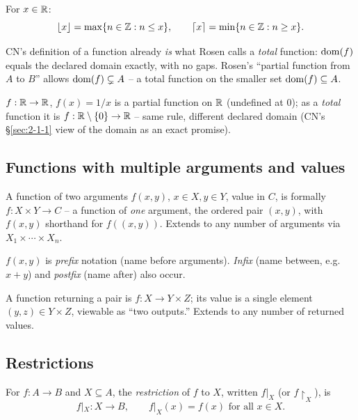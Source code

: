 \documentclass[11pt]{article}
\begin{document}
\begin{definition}
For $x \in \mathbb{R}$:
\[
\lfloor x \rfloor = \max\{n \in \mathbb{Z} : n \le x\}, \qquad
\lceil x \rceil = \min\{n \in \mathbb{Z} : n \ge x\}.
\]
\end{definition}

\begin{note}
CN's definition of a function already \emph{is} what Rosen calls a \emph{total} function: $\operatorname{dom}(f)$ equals the declared domain exactly, with no gaps. Rosen's ``partial function from $A$ to $B$'' allows $\operatorname{dom}(f)\subsetneq A$ -- a total function on the smaller set $\operatorname{dom}(f)\subseteq A$.
\end{note}

\begin{example}
$f:\mathbb{R}\to\mathbb{R}$, $f(x)=1/x$ is a partial function on $\mathbb{R}$ (undefined at $0$); as a \emph{total} function it is $f:\mathbb{R}\setminus\{0\}\to\mathbb{R}$ -- same rule, different declared domain (CN's \S\ref{sec:2-1-1} view of the domain as an exact promise).
\end{example}

\subsection{Functions with multiple arguments and values}
\label{sec:2-5}
\begin{definition}
A function of two arguments $f(x,y)$, $x \in X, y \in Y$, value in $C$, is formally $f: X \times Y \to C$ -- a function of \emph{one} argument, the ordered pair $(x,y)$, with $f(x,y)$ shorthand for $f((x,y))$. Extends to any number of arguments via $X_1 \times \cdots \times X_n$.
\end{definition}

\begin{note}
$f(x,y)$ is \emph{prefix} notation (name before arguments). \emph{Infix} (name between, e.g.\ $x+y$) and \emph{postfix} (name after) also occur.
\end{note}

\begin{definition}
A function returning a pair is $f: X \to Y \times Z$; its value is a single element $(y,z) \in Y \times Z$, viewable as ``two outputs.'' Extends to any number of returned values.
\end{definition}

\subsection{Restrictions}
\label{sec:2-6}
\begin{definition}[Restriction]
For $f: A \to B$ and $X \subseteq A$, the \emph{restriction} of $f$ to $X$, written $f|_X$ (or $f\restriction_X$), is
\[
f|_X : X \to B, \qquad f|_X(x) = f(x) \text{ for all } x \in X.
\]
\end{definition}
\end{document}
